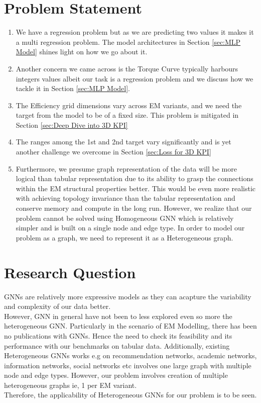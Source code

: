 \documentclass{report} %
\begin{document}
\section{Problem Statement}\label{sec:Problem Statement}

\begin{enumerate}

    \item We have a regression problem but as we are predicting two values it makes it a multi regression problem. The model 
    architectures in Section \ref{sec:MLP Model} shines light on how we go about it.
    \item Another concern we came across is the Torque Curve typically harbours integers values albeit our task is a regression problem and we discuss how we tackle it in Section \ref{sec:MLP Model}. 
    \item The Efficiency grid dimensions vary across \ac{EM} variants, and we need the target from the model to be of a fixed size. This problem is mitigated in Section \ref{sec:Deep Dive into 3D KPI}
    \item The ranges among the 1st and 2nd target vary significantly and is yet another challenge we overcome in Section \ref{sec:Loss for 3D KPI}
    \item Furthermore, we presume graph representation of the data will be more logical than tabular representation due to its ability to grasp the connections within the \ac{EM} structural properties better.
    This would be even more realistic with achieving topology invariance than the tabular representation and conserve memory and compute in the long run.
    However, we realize that our problem cannot be solved using Homogeneous \ac{GNN} which is relatively simpler and is built on a single node and edge type.
    In order to model our problem as a graph, we need to represent it as a Heterogeneous graph. \\

\end{enumerate}

\section{Research Question}\label{sec:Research Question}
\ac{GNN}s are relatively more expressive models as they can acapture the variability and complexity of our data better.\\
However, \ac{GNN} in general have not been to less explored even so more the heterogeneous \ac{GNN}.
Particularly in the scenario of \ac{EM} Modelling, there has been no publications with \ac{GNN}s.
Hence the need to check its feasibility and its performance with our benchmarks on tabular data.
Additionally, existing Heterogeneous \ac{GNN}s works e.g on recommendation networks, academic networks, information networks, social networks etc involves one large graph with multiple node and edge types. 
However, our problem involves creation of multiple heterogeneous graphs ie, 1 per \ac{EM} variant.\\
Therefore, the applicability of Heterogeneous \ac{GNN}s for our problem is to be seen.\\
\end{document}
